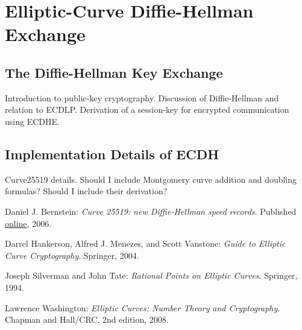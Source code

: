 \documentclass{article}
\begin{document}
\clearpage

\section{Elliptic-Curve Diffie-Hellman Exchange}

\subsection{The Diffie-Hellman Key Exchange}
Introduction to public-key cryptography.
Discussion of Diffie-Hellman and relation to ECDLP.
Derivation of a session-key for encrypted communication using ECDHE.

\subsection{Implementation Details of ECDH}
Curve25519 details.
Should I include Montgomery curve addition and doubling formulas?
Should I include their derivation?

\clearpage

\begin{thebibliography}{9}

	Daniel J. Bernstein:
	\emph{Curve 25519: new Diffie-Hellman speed records}.
	Published \href{http://cr.yp.to/ecdh/curve25519-20060209.pdf}{online},
	2006.

	Darrel Hankerson, Alfred J. Menezes, and Scott Vanstone:
	\emph{Guide to Elliptic Curve Cryptography}.
	Springer,
	2004.

	Joseph Silverman and John Tate:
	\emph{Rational Points on Elliptic Curves}.
	Springer,
	1994.

	Lawrence Washington:
	\emph{Elliptic Curves: Number Theory and Cryptography}.
	Chapman and Hall/CRC,
	2nd edition,
	2008.

\end{thebibliography}
\end{document}
